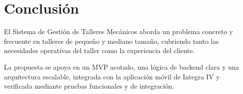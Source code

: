 \documentclass[11pt]{article}
\begin{document}
\section{Conclusión}

El Sistema de Gestión de Talleres Mecánicos aborda un problema concreto y frecuente en talleres de pequeño y mediano tamaño, cubriendo tanto las necesidades operativas del taller como la experiencia del cliente.

La propuesta se apoya en un MVP acotado, una lógica de backend clara y una arquitectura escalable, integrada con la aplicación móvil de Integra IV y verificada mediante pruebas funcionales y de integración.
\end{document}
